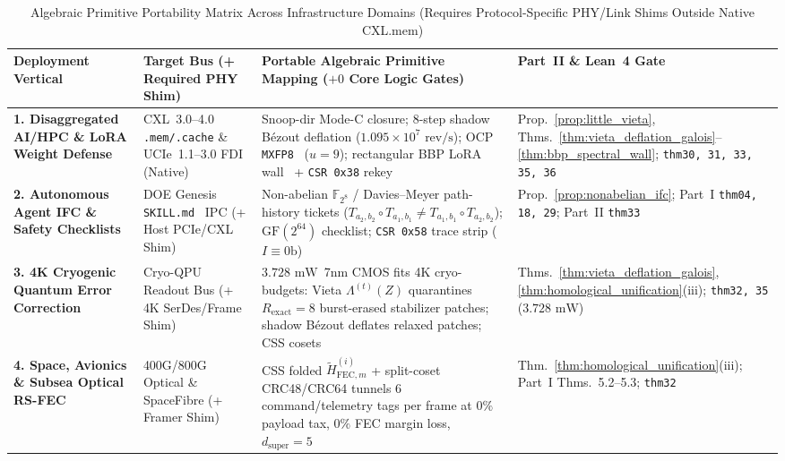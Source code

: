\documentclass[10pt,twocolumn]{article}
\providecommand{\AsicTotalPowerMw}{\ensuremath{3.728\text{~mW}}}
\theoremstyle{spectralthm}
\begin{document}
\begin{table}[!tp]
\centering
\footnotesize
\setlength{\tabcolsep}{5.0pt}
\renewcommand{\arraystretch}{1.19}
\caption{Algebraic Primitive Portability Matrix Across Infrastructure Domains (Requires Protocol-Specific PHY/Link Shims Outside Native CXL.mem)}
\label{tab:multimodal_matrix}
\begin{tabularx}{\textwidth}{@{}>{\raggedright\hyphenpenalty=10000\arraybackslash}p{3.35cm} >{\raggedright\arraybackslash}p{3.95cm} >{\raggedright\arraybackslash}X >{\raggedright\arraybackslash}p{3.65cm}@{}}
\toprule
\textbf{Deployment Vertical} & \textbf{Target Bus (+ Required PHY Shim)} & \textbf{Portable Algebraic Primitive Mapping ($+0$ Core Logic Gates)} & \textbf{Part~II \& Lean~4 Gate} \\
\midrule
\textbf{1. Disaggregated AI/HPC \& LoRA Weight Defense} & \mbox{CXL~3.0--4.0} \texttt{.mem/.cache} \& \mbox{UCIe~1.1--3.0} FDI (Native) & Snoop-dir Mode-C closure; 8-step shadow B\'{e}zout deflation ($1.095\times 10^7\text{~rev/s}$); OCP \texttt{MXFP8}~\cite{rouhani2023microscaling} ($u=9$); rectangular BBP LoRA wall~\cite{benaych2012singular} + \texttt{CSR 0x38} rekey & Prop.~\ref{prop:little_vieta}, Thms.~\ref{thm:vieta_deflation_galois}--\ref{thm:bbp_spectral_wall}; \texttt{thm30, 31, 33, 35, 36} \\
\textbf{2. Autonomous Agent IFC \& Safety Checklists} & DOE Genesis \texttt{SKILL.md}~\cite{doe2025genesis} IPC (+ Host PCIe/CXL Shim) & Non-abelian $\mathbb{F}_{2^8}$ / Davies--Meyer path-history tickets ($T_{a_2,b_2}\circ T_{a_1,b_1} \neq T_{a_1,b_1}\circ T_{a_2,b_2}$); $\mathrm{GF}(2^{64})$ checklist; \texttt{CSR 0x58} trace strip ($I\equiv 0\text{b}$) & Prop.~\ref{prop:nonabelian_ifc}; Part~I \texttt{thm04, 18, 29}; Part~II \texttt{thm33} \\
\textbf{3. 4K Cryogenic Quantum Error Correction} & Cryo-QPU Readout Bus (+ 4K SerDes/Frame Shim) & \AsicTotalPowerMw\ 7nm CMOS fits 4K cryo-budgets: Vieta $\Lambda^{(t)}(Z)$ quarantines $R_{\mathrm{exact}}=8$ burst-erased stabilizer patches; shadow B\'{e}zout deflates relaxed patches; CSS cosets~\cite{calderbank1996good} & Thms.~\ref{thm:vieta_deflation_galois}, \ref{thm:homological_unification}(iii); \texttt{thm32, 35} (\AsicTotalPowerMw) \\
\textbf{4. Space, Avionics \& Subsea Optical RS-FEC} & 400G/800G Optical \& SpaceFibre (+ Framer Shim) & CSS folded $\tilde{H}_{\mathrm{FEC},m}^{(i)}$ + split-coset CRC48/CRC64 tunnels 6 command/telemetry tags per frame at $0\%$ payload tax, $0\%$ FEC margin loss, $d_{\mathrm{super}}=5$ & Thm.~\ref{thm:homological_unification}(iii); Part~I Thms.~5.2--5.3; \texttt{thm32} \\

\end{tabularx}
\end{table}
\end{document}
